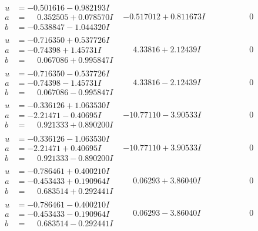 \documentclass[1p]{elsarticle_modified}
\theoremstyle{definition}
\begin{document}
$$\begin{array}{c|c|c}
\begin{aligned}
u &= -0.501616 - 0.982193 I \\
a &= \phantom{-}0.352505 + 0.078570 I \\
b &= -0.538847 - 1.044320 I\end{aligned}
 & -0.517012 + 0.811673 I & \phantom{-0.000000 } 0 \\ \hline\begin{aligned}
u &= -0.716350 + 0.537726 I \\
a &= -0.74398 + 1.45731 I \\
b &= \phantom{-}0.067086 + 0.995847 I\end{aligned}
 & \phantom{-}4.33816 + 2.12439 I & \phantom{-0.000000 } 0 \\ \hline\begin{aligned}
u &= -0.716350 - 0.537726 I \\
a &= -0.74398 - 1.45731 I \\
b &= \phantom{-}0.067086 - 0.995847 I\end{aligned}
 & \phantom{-}4.33816 - 2.12439 I & \phantom{-0.000000 } 0 \\ \hline\begin{aligned}
u &= -0.336126 + 1.063530 I \\
a &= -2.21471 - 0.40695 I \\
b &= \phantom{-}0.921333 + 0.890200 I\end{aligned}
 & -10.77110 - 3.90533 I & \phantom{-0.000000 } 0 \\ \hline\begin{aligned}
u &= -0.336126 - 1.063530 I \\
a &= -2.21471 + 0.40695 I \\
b &= \phantom{-}0.921333 - 0.890200 I\end{aligned}
 & -10.77110 + 3.90533 I & \phantom{-0.000000 } 0 \\ \hline\begin{aligned}
u &= -0.786461 + 0.400210 I \\
a &= -0.453433 + 0.190964 I \\
b &= \phantom{-}0.683514 + 0.292441 I\end{aligned}
 & \phantom{-}0.06293 + 3.86040 I & \phantom{-0.000000 } 0 \\ \hline\begin{aligned}
u &= -0.786461 - 0.400210 I \\
a &= -0.453433 - 0.190964 I \\
b &= \phantom{-}0.683514 - 0.292441 I\end{aligned}
 & \phantom{-}0.06293 - 3.86040 I & \phantom{-0.000000 } 0 \\ \hline\begin{aligned}

\end{aligned}
\end{array}$$
\end{document}
